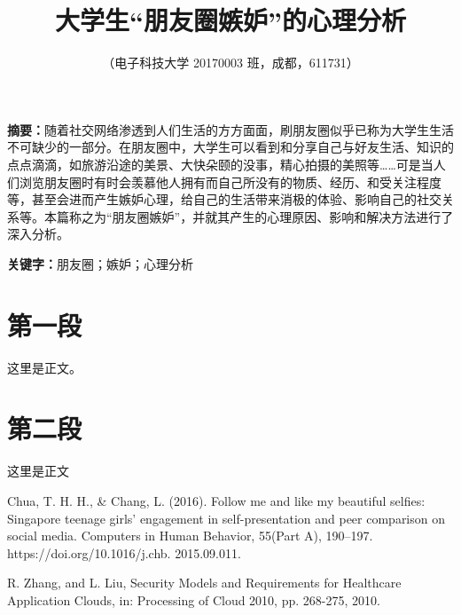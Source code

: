 \documentclass{ctexart}
\title{大学生“朋友圈嫉妒”的心理分析}
\date{}
\author{（电子科技大学 20170003 班，成都，611731）}
\begin{document}
\pagestyle{fancy}

\maketitle
\thispagestyle{fancy}

{\bfseries 摘要：}随着社交网络渗透到人们生活的方方面面，刷朋友圈似乎已称为大学生生活不可缺少的一部分。在朋友圈中，大学生可以看到和分享自己与好友生活、知识的点点滴滴，如旅游沿途的美景、大快朵颐的没事，精心拍摄的美照等……可是当人们浏览朋友圈时有时会羡慕他人拥有而自己所没有的物质、经历、和受关注程度等，甚至会进而产生嫉妒心理，给自己的生活带来消极的体验、影响自己的社交关系等。本篇称之为“朋友圈嫉妒”，并就其产生的心理原因、影响和解决方法进行了深入分析。

{\bfseries 关键字：}朋友圈；嫉妒；心理分析

\begin{multicols}{2} %
\section{第一段}
这里是正文。\lipsum[1]

\section{第二段}
这里是正文 \lipsum[2]
\end{multicols}

\begin{thebibliography}{}
	
	Chua, T. H. H., \& Chang, L. (2016). Follow me and like my beautiful selfies: Singapore teenage girls’ engagement in self-presentation and peer comparison on social media. Computers in Human Behavior, 55(Part A), 190–197. https://doi.org/10.1016/j.chb. 2015.09.011. 
	
	R. Zhang, and L. Liu, Security Models and Requirements for Healthcare Application Clouds, in: Processing of  Cloud 2010, pp. 268-275, 2010.
\end{thebibliography}
\end{document}

